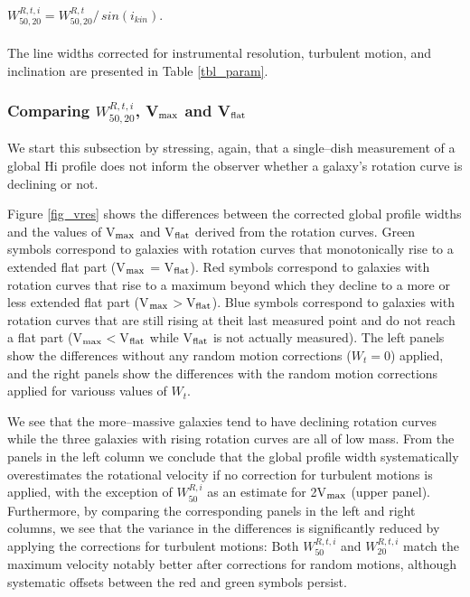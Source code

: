\documentclass[usenatbib,useAMS]{mnras}
\begin{document}
$W_{50,20}^{R,t,i} = W_{50,20}^{R,t}/\, sin(i_{kin})$.\\\\ 
The line widths corrected for instrumental resolution, turbulent motion,
and inclination are presented in Table \ref{tbl_param}. 


\subsubsection{Comparing $W_{50,20}^{R,t,i}$,  V$_{\rm max}$ and V$_{\rm flat}$}

We start this subsection by stressing, again, that a single--dish
measurement of a global H{\sc i} profile does not inform the observer
whether a galaxy's rotation curve is declining or not. 

Figure \ref{fig_vres} shows the differences between the corrected global
profile widths and the values of V$_{\rm max}$ and V$_{\rm flat}$
derived from the rotation curves.  Green symbols correspond to galaxies
with rotation curves that monotonically rise to a extended flat part
(V$_{\rm max}$ = V$_{\rm flat}$).  Red symbols correspond to galaxies
with rotation curves that rise to a maximum beyond which they decline to
a more or less extended flat part (V$_{\rm max}$$>$V$_{\rm flat}$). 
Blue symbols correspond to galaxies with rotation curves that are still
rising at theit last measured point and do not reach a flat part
(V$_{\rm max}$$<$V$_{\rm flat}$ while V$_{\rm flat}$ is not actually
measured).  The left panels show the differences without any random
motion corrections ($W_{t}=0$) applied, and the right panels show the
differences with the random motion corrections applied for variouss
values of $W_{t}$. 

We see that the more--massive galaxies tend to have declining rotation
curves while the three galaxies with rising rotation curves are all of
low mass.  From the panels in the left column we conclude that the
global profile width systematically overestimates the rotational
velocity if no correction for turbulent motions is applied, with the
exception of $W_{50}^{R,i}$ as an estimate for 2V$_{\rm max}$ (upper
panel).  Furthermore, by comparing the corresponding panels in the left
and right columns, we see that the variance in the differences is
significantly reduced by applying the corrections for turbulent motions:
Both $W_{50}^{R,t,i}$ and $W_{20}^{R,t,i}$ match the maximum velocity
notably better after corrections for random motions, although systematic
offsets between the red and green symbols persist. 
\end{document}

